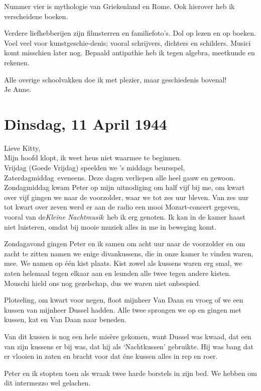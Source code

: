 \documentclass{book}
\begin{document}
Nummer vier is mythologie van Griekenland en Rome. Ook hierover heb ik
verscheidene boeken.

Verdere liefhebberijen zijn filmsterren en familiefoto's. Dol op lezen en op
boeken. Voel veel voor kunstgeschie-denis; vooral schrijvers, dichters en
schilders. Musici komt misschien later nog. Bepaald antipathie heb ik tegen
algebra, meetkunde en rekenen.

Alle overige schoolvakken doe ik met plezier, maar geschiedenis bovenal!\\
Je
Anne.

\section*{Dinsdag, 11 April 1944}

Lieve Kitty,\\
Mijn hoofd klopt, ik weet heus niet waarmee te beginnen.\\
Vrijdag (Goede Vrijdag) speelden we 's middags beursspel,
Zaterdagmiddag~eveneens. Deze dagen verliepen alle heel gauw en gewoon.
Zondagmiddag kwam Peter op mijn uitnodiging om half vijf bij me, om kwart over
vijf gingen we naar de voorzolder, waar we tot zes uur bleven. Van zes uur tot
kwart over zeven werd er aan de radio een mooi Mozart-concert gegeven, vooral
van de\emph{Kleine Nachtmusik}~heb ik erg genoten. Ik kan in de kamer haast niet
luisteren, omdat bij mooie muziek alles in me in beweging komt.

Zondagavond gingen Peter en ik samen om acht uur naar de voorzolder en om zacht
te zitten namen we enige divankussens, die in onze kamer te vinden waren, mee.
We namen op één kist plaats. Kist zowel als kussens waren erg smal, we zaten
helemaal tegen elkaar aan en leunden alle twee tegen andere kisten. Mouschi
hield ons nog gezelschap, dus we waren niet onbespied.

Plotseling, om kwart voor negen, floot mijnheer Van Daan en vroeg of we een
kussen van mijnheer Dussel hadden. Alle twee sprongen we op en gingen met
kussen, kat en Van Daan naar beneden.

Van dit kussen is nog een hele misère gekomen, want Dussel was kwaad, dat een
van zijn kussens er bij was, dat hij als `Nachtkussen' gebruikte. Hij was bang
dat er vlooien in zaten en bracht voor dat éne kussen alles in rep en roer.

Peter en ik stopten toen als wraak twee harde borstels in zijn bed. We hebben om
dit intermezzo wel gelachen.
\end{document}
